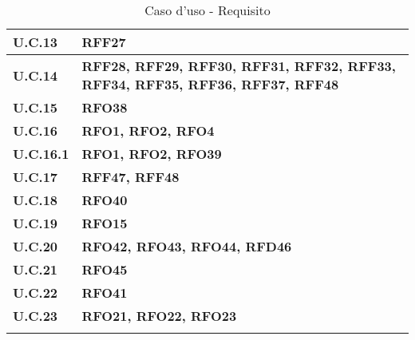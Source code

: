 \begin{longtable}{|>{\centering\arraybackslash}m{}|>{\centering\arraybackslash}m{}|}
	\textbf{U.C.13} & \textbf{RFF27} \\\hline
	\textbf{U.C.14} & \textbf{RFF28, RFF29, RFF30, RFF31, RFF32, RFF33, RFF34, RFF35, RFF36, RFF37, RFF48} \\\hline
	\textbf{U.C.15} & \textbf{RFO38} \\\hline
	\textbf{U.C.16} & \textbf{RFO1, RFO2, RFO4} \\\hline
	\textbf{U.C.16.1} & \textbf{RFO1, RFO2, RFO39} \\\hline
	\textbf{U.C.17} & \textbf{RFF47, RFF48} \\\hline
	\textbf{U.C.18} & \textbf{RFO40} \\\hline
	\textbf{U.C.19} & \textbf{RFO15} \\\hline
	\textbf{U.C.20} & \textbf{RFO42, RFO43, RFO44, RFD46} \\\hline
	\textbf{U.C.21} & \textbf{RFO45} \\\hline
	\textbf{U.C.22} & \textbf{RFO41} \\\hline
	\textbf{U.C.23} & \textbf{RFO21, RFO22, RFO23} \\\hline
	\caption{Caso d'uso - Requisito}
\end{longtable}